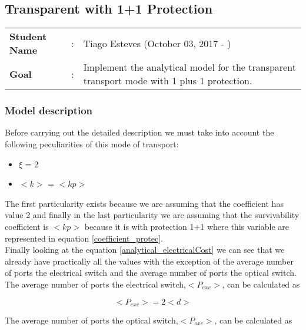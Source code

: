 \clearpage

\subsection{Transparent with 1+1 Protection}\label{analytical_Transp_Protection}
\begin{tcolorbox}	
\begin{tabular}{p{2.75cm} p{0.2cm} p{10.5cm}} 	
\textbf{Student Name}  &:& Tiago Esteves    (October 03, 2017 - )\\
\textbf{Goal}          &:& Implement the analytical model for the transparent transport mode with 1 plus 1 protection.
\end{tabular}
\end{tcolorbox}

\subsubsection{Model description}

Before carrying out the detailed description we must take into account the following peculiarities of this mode of transport:
\begin{itemize}
  \item $\xi$ = 2
  \item $<k>$ = $<kp>$
\end{itemize}

\vspace{11pt}
The first particularity exists because we are assuming that the coefficient has value 2 and finally in the last particularity we are assuming that the survivability coefficient is $<kp>$ because it is with protection 1+1 where this variable are represented in equation \ref{coefficient_protec}.\\

Finally looking at the equation \ref{analytical_electricalCost} we can see that we already have practically all the values with the exception of the average number of ports the electrical switch and the average number of ports the optical switch.\\

The average number of ports the electrical switch,$<P_{exc}>$, can be calculated as

\begin{equation}
<P_{exc}> = 2 <d>
\label{Pexc_transp_protec}
\end{equation}
\vspace{11pt}

The average number of ports the optical switch,$<P_{oxc}>$, can be calculated as

